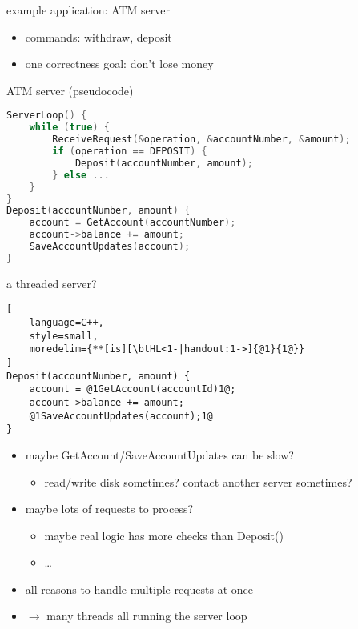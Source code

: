 \usetikzlibrary{fit}
% 

\begin{frame}{example application: ATM server}
\begin{itemize}
    \item commands: withdraw, deposit
    \item one correctness goal: don't lose money
\end{itemize}
\end{frame}

\begin{frame}[fragile,label=serverCode]{ATM server}
\vspace{-.5cm}
{\small (pseudocode)}
\begin{lstlisting}[language=C++,style=small]
ServerLoop() {
    while (true) {
        ReceiveRequest(&operation, &accountNumber, &amount);
        if (operation == DEPOSIT) {
            Deposit(accountNumber, amount);
        } else ...
    }
}
Deposit(accountNumber, amount) {
    account = GetAccount(accountNumber);
    account->balance += amount;
    SaveAccountUpdates(account);
}
\end{lstlisting}
\end{frame}

\begin{frame}[fragile,label=threadedServerWhy]{a threaded server?}
\begin{lstlisting}[
    language=C++,
    style=small,
    moredelim={**[is][\btHL<1-|handout:1->]{@1}{1@}}
]
Deposit(accountNumber, amount) {
    account = @1GetAccount(accountId)1@;
    account->balance += amount;
    @1SaveAccountUpdates(account);1@
}
\end{lstlisting}
\begin{itemize}
\item maybe GetAccount/SaveAccountUpdates can be slow?
    \begin{itemize}
    \item read/write disk sometimes? contact another server sometimes?
    \end{itemize}
\item maybe lots of requests to process?
    \begin{itemize}
    \item maybe real logic has more checks than Deposit()
    \item \ldots
    \end{itemize}
\item all reasons to handle multiple requests at once
\item $\rightarrow$ many threads all running the server loop
\end{itemize}
\end{frame}

